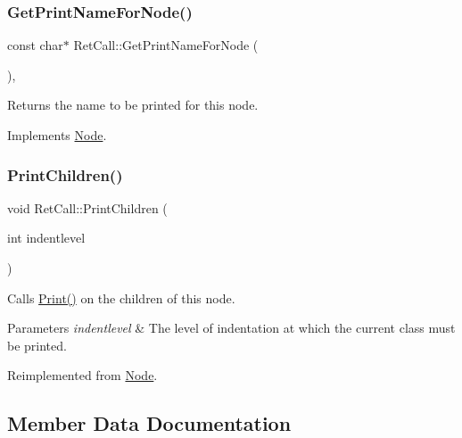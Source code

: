 \subsubsection{\texorpdfstring{Get\+Print\+Name\+For\+Node()}{GetPrintNameForNode()}}
{\footnotesize\ttfamily const char$\ast$ Ret\+Call\+::\+Get\+Print\+Name\+For\+Node (\begin{DoxyParamCaption}{ }\end{DoxyParamCaption})\hspace{0.3cm}{\ttfamily [inline]}, {\ttfamily [virtual]}}

Returns the name to be printed for this node. 

Implements \hyperlink{class_node_a56e29657306ffb004d69c6929ae44269}{Node}.

\mbox{\label{class_ret_call_a93de1dff14cd07dd58441a320df7f798}} 
\subsubsection{\texorpdfstring{Print\+Children()}{PrintChildren()}}
{\footnotesize\ttfamily void Ret\+Call\+::\+Print\+Children (\begin{DoxyParamCaption}\item[{int}]{indentlevel }\end{DoxyParamCaption})\hspace{0.3cm}{\ttfamily [virtual]}}

Calls \hyperlink{class_node_a9ef727fd72d1a37792b3db60a8a479dd}{Print()} on the children of this node. 
\begin{DoxyParams}{Parameters}
{\em indentlevel} & The level of indentation at which the current class must be printed. \\
\hline
\end{DoxyParams}


Reimplemented from \hyperlink{class_node_a3e67ec8d22182b721717af14fe0c3000}{Node}.



\subsection{Member Data Documentation}
\mbox{\label{class_ret_call_a2be9b1449ca100c24744097616f15db8}} 
